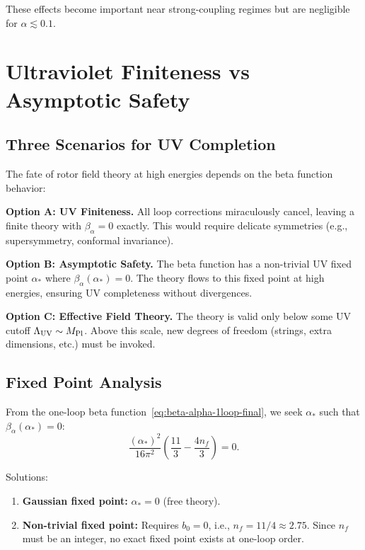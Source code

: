 \documentclass[11pt,a4paper]{article}
\numberwithin{equation}{section}
\theoremstyle{plain}
\theoremstyle{definition}
\theoremstyle{remark}
\begin{document}
These effects become important near strong-coupling regimes but are negligible for $\alpha\lesssim 0.1$.

\vspace{1em}

\section{Ultraviolet Finiteness vs Asymptotic Safety}\label{sec:UV}

\subsection{Three Scenarios for UV Completion}

The fate of rotor field theory at high energies depends on the beta function behavior:

\textbf{Option A: UV Finiteness.} All loop corrections miraculously cancel, leaving a finite theory with $\beta_\alpha=0$ exactly. This would require delicate symmetries (e.g., supersymmetry, conformal invariance).

\textbf{Option B: Asymptotic Safety.} The beta function has a non-trivial UV fixed point $\alpha_*$ where $\beta_\alpha(\alpha_*)=0$. The theory flows to this fixed point at high energies, ensuring UV completeness without divergences.

\textbf{Option C: Effective Field Theory.} The theory is valid only below some UV cutoff $\Lambda_{\rm UV} \sim M_{\rm Pl}$. Above this scale, new degrees of freedom (strings, extra dimensions, etc.) must be invoked.

\subsection{Fixed Point Analysis}

From the one-loop beta function~\eqref{eq:beta-alpha-1loop-final}, we seek $\alpha_*$ such that $\beta_\alpha(\alpha_*)=0$:
\begin{equation}
\frac{(\alpha_*)^2}{16\pi^2}\left(\frac{11}{3} - \frac{4n_f}{3}\right) = 0.
\label{eq:fixed-point-eqn}
\end{equation}

Solutions:
\begin{enumerate}
  \item \textbf{Gaussian fixed point:} $\alpha_*=0$ (free theory).
  \item \textbf{Non-trivial fixed point:} Requires $b_0=0$, i.e., $n_f = 11/4 \approx 2.75$. Since $n_f$ must be an integer, no exact fixed point exists at one-loop order.
\end{enumerate}
\end{document}
